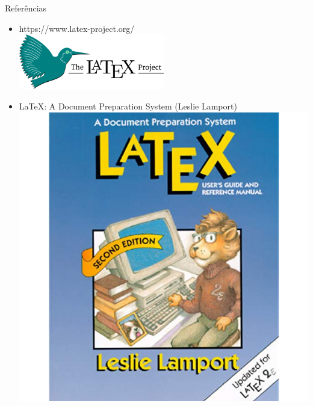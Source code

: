 \documentclass{beamer}
\begin{document}
\begin{frame}{Referências}
	
	
			\begin{itemize}
				\item https://www.latex-project.org/ \\
				\includegraphics[width=0.5\textwidth]{latex-project-logo.png}
				
				
				\item LaTeX: A Document Preparation System (Leslie Lamport) \\
				\includegraphics[scale=0.2]{livro.png}
			\end{itemize}

	
	
\end{frame}
\end{document}
